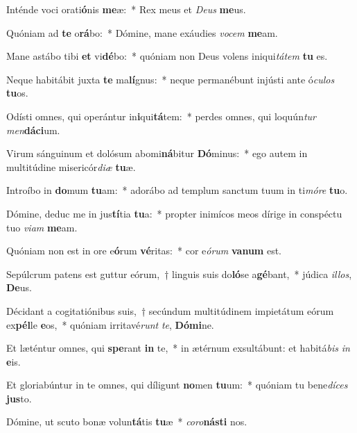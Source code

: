 \item Inténde voci orati\textbf{ó}nis \textbf{me}æ:~* Rex meus et \textit{De}\textit{us} \textbf{me}us.
\item Quóniam ad \textbf{te} o\textbf{rá}bo:~* Dómine, mane exáudies \textit{vo}\textit{cem} \textbf{me}am.
\item Mane astábo tibi \textbf{et} vi\textbf{dé}bo:~* quóniam non Deus volens iniqui\textit{tá}\textit{tem} \textbf{tu} es.
\item Neque habitábit juxta \textbf{te} ma\textbf{lí}gnus:~* neque permanébunt injústi ante ó\textit{cu}\textit{los} \textbf{tu}os.
\item Odísti omnes, qui operántur in\textbf{i}qui\textbf{tá}tem:~* perdes omnes, qui loquún\textit{tur} \textit{men}\textbf{dá}\textbf{ci}um.
\item Virum sánguinum et dolósum abomi\textbf{ná}bitur \textbf{Dó}minus:~* ego autem in multitúdine misericór\textit{di}\textit{æ} \textbf{tu}æ.
\item Introíbo in \textbf{do}mum \textbf{tu}am:~* adorábo ad templum sanctum tuum in ti\textit{mó}\textit{re} \textbf{tu}o.
\item Dómine, deduc me in jus\textbf{tí}tia \textbf{tu}a:~* propter inimícos meos dírige in conspéctu tuo \textit{vi}\textit{am} \textbf{me}am.
\item Quóniam non est in ore e\textbf{ó}rum \textbf{vé}ritas:~* cor e\textit{ó}\textit{rum} \textbf{va}\textbf{num} est.
\item Sepúlcrum patens est guttur eórum,~† linguis suis do\textbf{ló}se a\textbf{gé}bant,~* júdica \textit{il}\textit{los}, \textbf{De}us.
\item Décidant a cogitatiónibus suis,~† secúndum multitúdinem impietátum eórum ex\textbf{pél}le \textbf{e}os,~* quóniam irritavé\textit{runt} \textit{te}, \textbf{Dó}\textbf{mi}ne.
\item Et læténtur omnes, qui \textbf{spe}rant \textbf{in} te,~* in ætérnum exsultábunt: et habitá\textit{bis} \textit{in} \textbf{e}is.
\item Et gloriabúntur in te omnes, qui díligunt \textbf{no}men \textbf{tu}um:~* quóniam tu bene\textit{dí}\textit{ces} \textbf{jus}to.
\item Dómine, ut scuto bonæ volun\textbf{tá}tis \textbf{tu}æ~* \textit{co}\textit{ro}\textbf{nás}\textbf{ti} nos.

